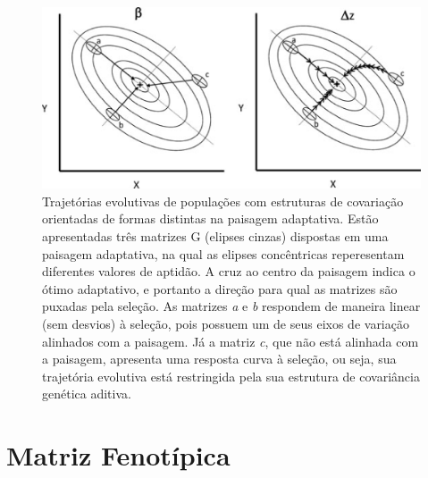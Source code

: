 \documentclass[portuges,]{tufte-handout}
\begin{document}
\begin{figure}
\includegraphics{./figuras/desvio-trajetorias.png}
\caption{Trajetórias evolutivas de populações com estruturas de
covariação orientadas de formas distintas na paisagem adaptativa. Estão
apresentadas três matrizes G (elipses cinzas) dispostas em uma paisagem
adaptativa, na qual as elipses concêntricas reperesentam diferentes
valores de aptidão. A cruz ao centro da paisagem indica o ótimo
adaptativo, e portanto a direção para qual as matrizes são puxadas pela
seleção. As matrizes \emph{a} e \emph{b} respondem de maneira linear
(sem desvios) à seleção, pois possuem um de seus eixos de variação
alinhados com a paisagem. Já a matriz \emph{c}, que não está alinhada
com a paisagem, apresenta uma resposta curva à seleção, ou seja, sua
trajetória evolutiva está restringida pela sua estrutura de covariância
genética aditiva.}
\label{desvio-trajetorias}
\end{figure}

\section{Matriz Fenotípica}\label{matriz-fenotuxedpica}
\end{document}
